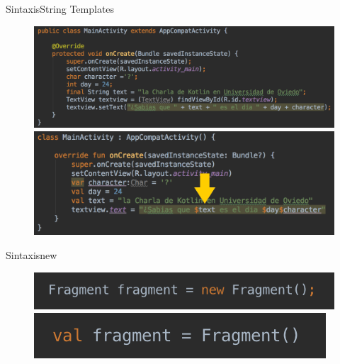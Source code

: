\begin{frame}{Sintaxis}{String Templates}
    \begin{figure}[h]
    \centering
    \includegraphics[width=\textwidth]{images/kotlin_vs_java/java_basic}
    \vspace{0pt}
    \includegraphics[width=\textwidth]{images/kotlin_vs_java/kotlin_string_templates}
    \end{figure}
\end{frame}

\begin{frame}{Sintaxis}{new}
    \begin{figure}[h]
    \centering
    \includegraphics[width=\textwidth]{images/kotlin_vs_java/java_new}
    \vspace{0pt}
    \includegraphics[width=\textwidth]{images/kotlin_vs_java/kotlin_new}
    \end{figure}
\end{frame}

